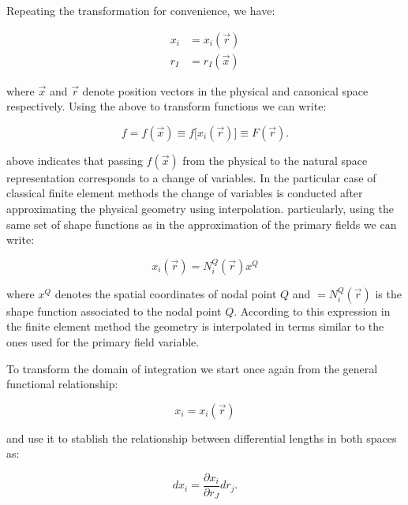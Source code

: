 Repeating the transformation for convenience, we have:

\begin{equation}
\begin{aligned}
x_i &=x_i(\overrightarrow r)\\
r_I &=r_I(\overrightarrow x)
\end{aligned}
\label{eq:transQ}
\end{equation}

where $\overrightarrow x$ and $\overrightarrow r$ denote position vectors in the physical and canonical space respectively. Using the above to transform functions we can write:



\begin{equation}
f=f(\overrightarrow x)\equiv f\lbrack x_i(\overrightarrow r)\rbrack\equiv F(\overrightarrow r).
\label{eq:FtransQ}
\end{equation}


 above indicates that passing $f(\overrightarrow x)$ from the physical to the natural space representation corresponds to a change of variables. In the particular case of classical finite element methods the change of variables is conducted after approximating the physical geometry using interpolation. particularly, using the same set of shape functions as in the approximation of the primary fields we can write:

\begin{equation}
x_i(\overrightarrow r)=N_i^Q(\overrightarrow r)x^Q
\label{eq:Strans}
\end{equation}

where $x^Q$ denotes the spatial coordinates of nodal point $Q$ and $=N_i^Q(\overrightarrow r)$ is the shape function associated to the nodal point $Q$. According to this expression in the finite element method the geometry is interpolated in terms similar to the ones used for the primary field variable.

To transform the domain of integration we start once again from the general functional relationship:

\[x_i =x_i(\overrightarrow r)\]

and  use it to stablish the relationship between differential lengths in both spaces as:


\begin{equation}
dx_i=\frac{\partial x_i}{\partial r_J}dr_j.
\label{eq:diflen}
\end{equation}

